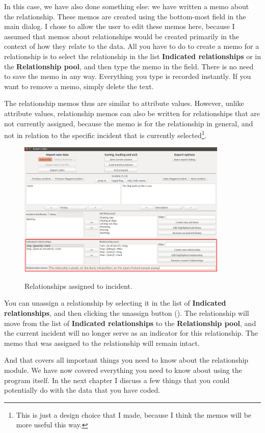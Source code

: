 \documentclass{memoir}
\begin{document}
In this case, we have also done something else: we have written a memo about the relationship. These memos are created using the bottom-most field in the main dialog. I chose to allow the user to edit these memos here, because I assumed that memos about relationships would be created primarily in the context of how they relate to the data. All you have to do to create a memo for a relationship is to select the relationship in the list \textbf{Indicated relationships} or in the \textbf{Relationship pool}, and then type the memo in the field. There is no need to save the memo in any way. Everything you type is recorded instantly. If you want to remove a memo, simply delete the text.

The relationship memos thus are similar to attribute values. However, unlike attribute values, relationship memos can also be written for relationships that are not currently assigned, because the memo is for the relationship in general, and not in relation to the specific incident that is currently selected\footnote{This is just a design choice that I made, because I think the memos will be more useful this way.}.

\begin{figure}[h!]
  \centering
  \caption{Relationships assigned to incident.}
  \includegraphics[width=100mm]{Screenshot_22.pdf}
  \label{fig:relationshipsassigned}
\end{figure}

You can unassign a relationship by selecting it in the list of \textbf{Indicated relationships}, and then clicking the unassign button (\textbf{\guillemotright}). The relationship will move from the list of \textbf{Indicated relationships} to the \textbf{Relationship pool}, and the current incident will no longer serve as an indicator for this relationship. The memo that was assigned to the relationship will remain intact.

And that covers all important things you need to know about the relationship module. We have now covered everything you need to know about using the program itself. In the next chapter I discuss a few things that you could potentially do with the data that you have coded. 
\end{document}

